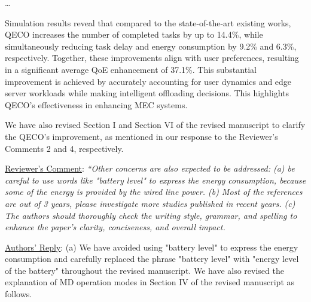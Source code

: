 \documentclass[12pt,draftclsnofoot,onecolumn]{IEEEtran}
\newcommand{\rev}[1]{{\color{blue}#1}} %
\newcommand{\rev}[1]{#1}
\newenvironment{my}[2]%
{\begin{list}{}%
{\setlength{\rightmargin}{#1}\setlength{\leftmargin}{#2}}%


 \item[]{}

} {\end{list}}
\begin{document}
\begin{enumerate}


		\begin{my}{1cm}{1cm}
	\rev{
 	\dots 
 	
					Simulation results reveal that compared to the state-of-the-art existing works, QECO increases the number of completed tasks by up to 14.4\%, while simultaneously reducing task delay and energy consumption by 9.2\% and 6.3\%, respectively. Together, these improvements align with user preferences, resulting in a significant average QoE enhancement of 37.1\%. This substantial improvement is achieved by accurately accounting for user dynamics and edge server workloads while making intelligent offloading decisions. This highlights QECO's effectiveness in enhancing MEC systems.}

	


\end{my}\vspace{6mm}

We have also revised Section I and Section VI of the revised manuscript to clarify the QECO's improvement, as mentioned in our response to the Reviewer's Comments 2 and 4, respectively.








\vspace{5mm}

\item \underline{Reviewer's Comment}: 
\textit{``Other concerns are also expected to be addressed: (a) be careful to use words like "battery level" to express the energy consumption, because some of the energy is provided by the wired line power. (b) Most of the references are out of 3 years, please investigate more studies published in recent years. (c) The authors should thoroughly check the writing style, grammar, and spelling to enhance the paper's clarity, conciseness, and overall impact.}\newline

\underline{Authors' Reply}: (a) We have avoided using "battery level" to express the energy consumption and carefully replaced the phrase "battery level" with "energy level of the battery" throughout the revised manuscript. We have also revised the explanation of MD operation modes in Section IV of the revised manuscript as follows. 

		\begin{my}{1cm}{1cm}
	\rev{
		
}
\end{my}
\end{enumerate}
\end{document}

